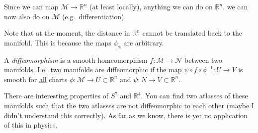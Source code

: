 Since we can map $\mathcal{M} \to \mathbb{R}^n$ (at least locally), anything we can do on $\mathbb{R}^n$, we can now also do on $\mathcal{M}$ (e.g.~differentiation).

\begin{leftbar}
  \begin{remark}
    Note that at the moment, the distance in $\mathbb{R}^n$ cannot be translated back to the manifold. This is because the maps $\phi_\alpha$ are arbitrary.
  \end{remark}
\end{leftbar}

\begin{definition}[Diffeomorphism]
  A \emph{diffeomorphism} is a smooth homeomorphism $f: \mathcal{M} \to \mathcal{N}$ between two manifolds.
  I.e.~two manifolds are diffeomorphic if the map $\psi \circ f \circ \phi^{-1}: U \to V$ is smooth for \underline{all} charts $\phi: \mathcal{M} \to U \subset \mathbb{R}^n$ and $\psi: N \to V \subset \mathbb{R}^n$.
\end{definition}

\begin{leftbar}
  \begin{remark}
    There are interesting properties of $S^7$ and $\mathbb{R}^{4}$. You can find two atlasses of these manifolds such that the two atlasses are not diffeomorphic to each other (maybe I didn't understand this correctly).
    As far as we know, there is yet no application of this in physics.
  \end{remark}
\end{leftbar}






